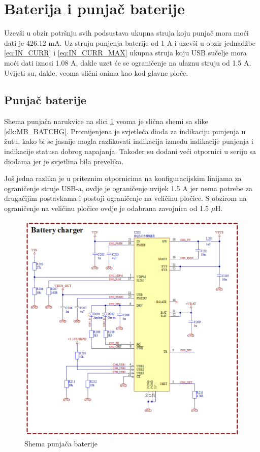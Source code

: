 \section{Baterija i punjač baterije}

Uzevši u obzir potršnju svih podsustava ukupna struja koju punjač mora moći dati je 426.12 mA. Uz struju punjenja baterije od 1 A i uzevši u obzir jednadžbe \ref{eq:IN_CURR} i \ref{eq:IN_CURR_MAX} ukupna struja koju USB sučelje mora moći dati iznosi 1.08 A, dakle uzet će se ograničenje na ulaznu struju od 1.5 A. Uvijeti su, dakle, veoma slični onima kao kod glavne ploče.

\subsection{Punjač baterije}
Shema punjača narukvice na slici \ref{slk:BR_BATCHG} veoma je slična shemi sa slike \ref{slk:MB_BATCHG}. Promijenjena je svjetleća dioda za indikaciju punjenja u žutu, kako bi se jasnije mogla razlikovati indikacija između indikacije punjenja i indikacije statusa dobrog napajanja. Također su dodani veći otpornici u seriju sa diodama jer je svjetlina bila prevelika.

Još jedna razlika je u priteznim otpornicima na konfiguracijskim linijama za ograničenje struje USB-a, ovdje je ograničenje uvijek 1.5 A jer nema potrebe za drugačijim postavkama i postoji ograničenje na veličinu pločice. S obzirom na ograničenje na veličinu pločice ovdje je odabrana zavojnica od 1.5 $\mu \textrm{H}$.
\begin{figure}[htb]
    \centering
    \includegraphics[width=\textwidth]{Figures/BR_BATCHG.png}
    \caption{Shema punjača baterije}
    \label{slk:BR_BATCHG}
\end{figure}

